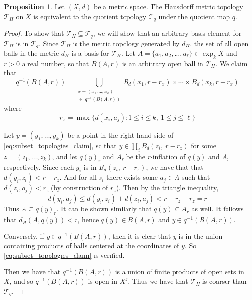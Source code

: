 \documentclass[12pt,twoside]{reedthesis}
\theoremstyle{definition}
\newtheorem{prop}[thm]{Proposition}
\begin{document}
\begin{prop}
  Let $(X, d)$ be a metric space.
  The Hausdorff metric topology $\mathcal{T}_H$ on $X$ is equivalent to the quotient topology $\mathcal{T}_q$ under the quotient map $q$.
\end{prop}

\begin{proof}
  To show that $\mathcal{T}_H \subseteq \mathcal{T}_q$, we will show that an arbitrary basis element for $\mathcal{T}_H$ is in $\mathcal{T}_q$.
  Since $\mathcal{T}_H$ is the metric topology generated by $d_H$, the set of all open balls in the metric $d_H$ is a basis for $\mathcal{T}_H$.
  Let $A = \{ a_1, a_2, \ldots, a_\ell \} \in \exp_k X$ and $r > 0$ a real number, so that $B(A, r)$ is an arbitrary open ball in $\mathcal{T}_H$.
  We claim that
  \begin{equation}\label{eq:subset_topologies_claim}
    q^{-1}(B(A,r)) = \bigcup_{\substack{x = (x_1, \ldots, x_k) \\ \in\ q^{-1}(B(A,r))}} B_d(x_1, r - r_x) \times \cdots \times B_d(x_k, r - r_x)
  \end{equation}
  where
  \begin{equation*}
    r_x = \max \{ d(x_i, a_j) : 1 \leq i \leq k,\ 1 \leq j \leq \ell \}
  \end{equation*}

  Let $y = (y_1, \ldots, y_k)$ be a point in the right-hand side of \eqref{eq:subset_topologies_claim}, so that $y \in \prod_i B_d(z_i,\ r - r_z)$ for some $z = (z_1, \ldots, z_k)$, and let $q(y)_r$ and $A_r$ be the $r$-inflation of $q(y)$ and $A$, respectively.
  Since each $y_i$ is in $B_d(z_i,\ r - r_z)$, we have that that $d(y_i, z_i) < r - r_z$.
  And for all $z_i$ there exists some $a_j \in A$ such that $d(z_i, a_j) < r_z$ (by construction of $r_z$).
  Then by the triangle inequality,
  \begin{equation*}
    d(y_i, a_j) \leq d(y_i, z_i) + d(z_i, a_j) < r - r_z + r_z = r
  \end{equation*}
  Thus $A \subseteq q(y)_r$.
  It can be shown similarly that $q(y) \subseteq A_r$ as well.
  It follows that $d_H(A, q(y)) < r$, hence $q(y) \in B(A,r)$ and $y \in q^{-1}(B(A,r))$. 
  
  Conversely, if $y \in q^{-1}(B(A,r))$, then it is clear that $y$ is in the union containing products of balls centered at the coordinates of $y$.
  So \eqref{eq:subset_topologies_claim} is verified.

  Then we have that $q^{-1}(B(A,r))$ is a union of finite products of open sets in $X$, and so $q^{-1}(B(A, r))$ is open in $X^k$.
  Thus we have that $\mathcal{T}_H$ is coarser than  $\mathcal{T}_q$.


\end{proof}
\end{document}
